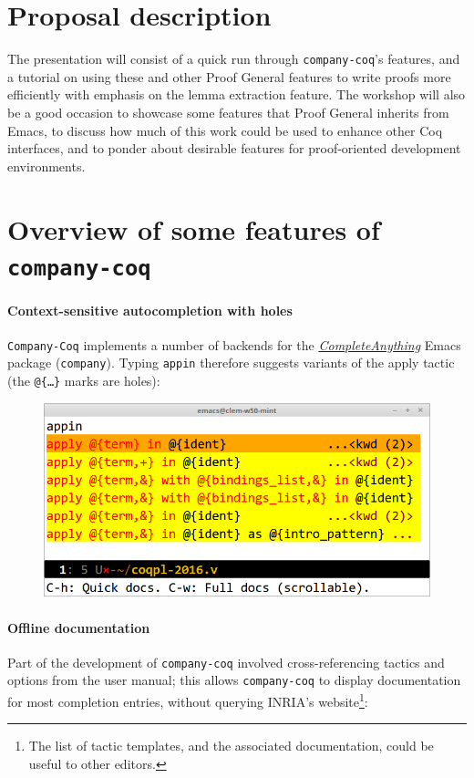 \documentclass[preprint]{sigplanconf}
\newcommand{\proofg}{Proof General\xspace}
\begin{document}
\section*{Proposal description}

The presentation will consist of a quick run through \texttt{company-coq}'s features, and a tutorial on using these and other \proofg features to write proofs more efficiently with emphasis on the lemma extraction feature. The workshop will also be a good occasion to showcase some features that \proofg inherits from Emacs, to discuss how much of this work could be used to enhance other Coq interfaces, and to ponder about desirable features for proof-oriented development environments.

\section*{Overview of some features of \texttt{company-coq}}

\paragraph{Context-sensitive autocompletion with holes} \texttt{Company-Coq} implements a number of backends for the \href{https://company-mode.github.io/}{\emph{CompleteAnything}} Emacs package (\texttt{company}). Typing \texttt{app{\kern0.5pt}in} therefore suggests variants of the apply tactic (the \texttt{@\{\ldots\}} marks are holes):

\begin{figure}[H]
  \centering
  \includegraphics[width=\linewidth]{apply-in-xxl-2.png}
\end{figure}

\paragraph{Offline documentation} Part of the development of \texttt{company-coq} involved cross-referencing tactics and options from the user manual; this allows \texttt{company-coq} to display documentation for most completion entries, without querying INRIA's website\footnote{The list of tactic templates, and the associated documentation, could be useful to other editors.}:
\end{document}
